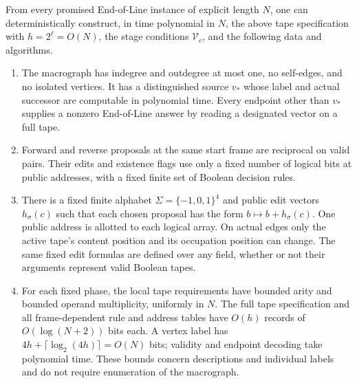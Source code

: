 \begin{lemma}\label{lem:macrograph}
From every promised End-of-Line instance of explicit length $N$, one
can deterministically construct, in time polynomial in $N$, the
above tape specification with $h=2^\ell=O(N)$, the stage conditions
$\mathcal V_c$, and the following data and algorithms.
\begin{enumerate}[label=\textup{(\roman*)}]
 \item The macrograph has indegree and outdegree at most one, no
 self-edges, and no isolated vertices.  It has a distinguished source
 $v_*$ whose label and actual successor are computable in polynomial
 time.  Every endpoint other than $v_*$ supplies a nonzero
 End-of-Line answer by reading a designated vector on a full tape.
 \item Forward and reverse proposals at the same start frame are
 reciprocal on valid pairs.  Their edits and existence flags use
 only a fixed number of logical bits at public addresses, with a
 fixed finite set of Boolean decision rules.
 \item There is a fixed finite alphabet
 $\Sigma=\{-1,0,1\}^4$ and public edit vectors $h_\sigma(c)$ such
 that each chosen proposal has the form
 $b\mapsto b+h_\sigma(c)$.  One public address is allotted to each
 logical array.  On actual edges only the active tape's content
 position and its occupation position can change.  The same fixed
 edit formulas are defined over any field, whether or not their
 arguments represent valid Boolean tapes.
 \item For each fixed phase, the local tape requirements have
 bounded arity and bounded operand multiplicity, uniformly in $N$.
 The full tape specification and all frame-dependent rule and
 address tables have $O(h)$ records of $O(\log(N+2))$ bits each.
 A vertex label has $4h+\lceil\log_2(4h)\rceil=O(N)$ bits;
 validity and endpoint decoding take polynomial time.  These
 bounds concern descriptions and individual labels and do not
 require enumeration of the macrograph.
\end{enumerate}
\end{lemma}

